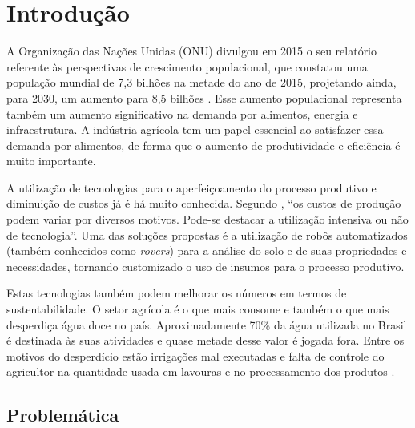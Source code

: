 \chapter{Introdução}

  A Organização das Nações Unidas (ONU) divulgou em 2015 o seu relatório referente
  às perspectivas de crescimento populacional, que constatou uma população mundial
  de 7,3 bilhões na metade do ano de 2015, projetando ainda, para 2030, um aumento
  para 8,5 bilhões \cite{ONU2015}. Esse aumento populacional representa também um
  aumento significativo na demanda por alimentos, energia e infraestrutura.
  A indústria agrícola tem um papel essencial ao satisfazer essa demanda por alimentos,
  de forma que o aumento de produtividade e eficiência é muito importante.

  A utilização de tecnologias para o aperfeiçoamento do processo produtivo e
  diminuição de custos já é há muito conhecida. Segundo \cite{RAMIZ1988},
  “os custos de produção podem variar por diversos motivos. Pode-se destacar a
  utilização intensiva ou não de tecnologia”. Uma das soluções propostas é a
  utilização de robôs automatizados (também conhecidos como \textit{rovers}) para a
  análise do solo e de suas propriedades e necessidades, tornando customizado
  o uso de insumos para o processo produtivo.

  Estas tecnologias também podem melhorar os números em termos de sustentabilidade.
  O setor agrícola é o que mais consome e também o que mais desperdiça água doce no país.
  Aproximadamente 70\% da água utilizada no Brasil é destinada às suas atividades
  e quase metade desse valor é jogada fora. Entre os motivos do desperdício estão
  irrigações mal executadas e falta de controle do agricultor na quantidade usada
  em lavouras e no processamento dos produtos \cite{antonelli}.

  \section{Problemática}

